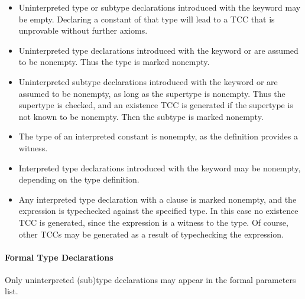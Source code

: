 \begin{itemize}

\item Uninterpreted type or subtype declarations introduced with the
keyword  may be empty.  Declaring a constant of that type
will lead to a TCC that is unprovable without further axioms.

\item Uninterpreted type declarations introduced with the keyword
or  are assumed to be nonempty.
Thus the type is marked nonempty.

\item Uninterpreted subtype declarations introduced with the keyword
 or  are assumed to be nonempty, as long as the
supertype is nonempty.  Thus the supertype is checked, and an existence
TCC is generated if the supertype is not known to be nonempty.  Then the
subtype is marked nonempty.

\item The type of an interpreted constant is nonempty, as the definition
provides a witness.

\item Interpreted type declarations introduced with the keyword
 may be nonempty, depending on the type definition.

\item Any interpreted type declaration with a  clause
is marked nonempty, and the  expression is typechecked
against the specified type.  In this case no existence TCC is generated,
since the  expression is a witness to the type.  Of
course, other TCCs may be generated as a result of typechecking the
 expression.

\end{itemize}

\paragraph{Formal Type Declarations}

Only uninterpreted (sub)type declarations may appear in the formal
parameters list.

